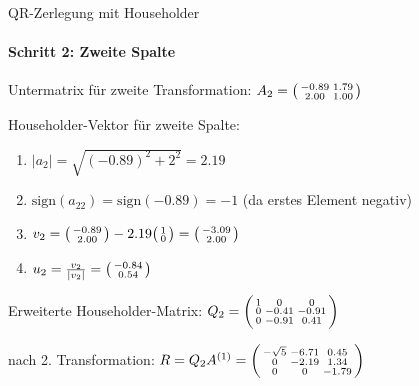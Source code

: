 \begin{example2}[breakable]{QR-Zerlegung mit Householder}
\paragraph{Schritt 2: Zweite Spalte}
Untermatrix für zweite Transformation:
$A_2 = \begin{psmallmatrix} -0.89 & 1.79\\ 2.00 & 1.00 \end{psmallmatrix}$

Householder-Vektor für zweite Spalte:
\vspace{1mm}
\begin{enumerate}
    \item $|a_2| = \sqrt{(-0.89)^2 + 2^2} = 2.19$
    \vspace{1mm}
    \item $\text{sign}(a_{22}) = \text{sign}(-0.89) = -1$ (da erstes Element negativ)
    \vspace{1mm}
    \item $v_2 = \begin{psmallmatrix} -0.89\\ 2.00 \end{psmallmatrix} - 2.19\begin{psmallmatrix} 1\\ 0 \end{psmallmatrix} = \begin{psmallmatrix} -3.09\\ 2.00 \end{psmallmatrix}$
    \vspace{1mm}
    \item $u_2 = \frac{v_2}{|v_2|} = \begin{psmallmatrix} -0.84\\ 0.54 \end{psmallmatrix}$
\end{enumerate}
\vspace{1mm}
Erweiterte Householder-Matrix: %
$Q_2 = \begin{psmallmatrix}
1 & 0 & 0\\
0 & -0.41 & -0.91\\
0 & -0.91 & 0.41
\end{psmallmatrix}$

nach 2. Transformation:
$R = Q_2A^{(1)} = \begin{psmallmatrix}
-\sqrt{5} & -6.71 & 0.45\\
0 & -2.19 & 1.34\\
0 & 0 & -1.79
\end{psmallmatrix}$


\end{example2}
